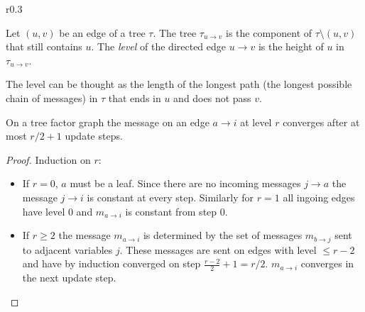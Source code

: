 \begin{wrapfigure}{r}{0.3\textwidth}

\end{wrapfigure}
\begin{definition} Let $(u, v)$ be an edge of a tree $\tau$. \newline
The tree $\tau_{u \rightarrow v}$ is the component of $\tau \setminus (u, v)$ that still contains $u$. The \emph{level} of the directed edge $u \rightarrow v$ is the height of $u$ in $\tau_{u \rightarrow v}$. 
\end{definition}
The level can be thought as the length of the longest path (the longest possible chain of messages) in $\tau$  that ends in $u$ and does not pass $v$.
\begin{lemma}\cite{survprob}
On a tree factor graph the message on an edge $a \rightarrow i$ at level $r$ converges after at most $r/2 + 1$ update steps.
\begin{proof} Induction on $r$:
\begin{itemize}
\item[] If $r = 0$, $a$ must be a leaf. Since there are no incoming messages $j \rightarrow a$ the message  $j \rightarrow i$ is constant at every step. \newline
Similarly for $r = 1$ all ingoing edges have level $0$ and $m_{a \rightarrow i}$ is constant from step $0$.
\item[] If $r \geq 2$ the message $m_{a \rightarrow i}$ is determined by the set of messages $m_{b \rightarrow j}$ sent to adjacent variables $j$. These messages are sent on edges with level $\leq r-2$ and have by induction converged on step $\frac{r-2}{2} + 1 = r / 2$. $m_{a \rightarrow i}$ converges in the next update step.
\end{itemize}
\end{proof}
\end{lemma}


